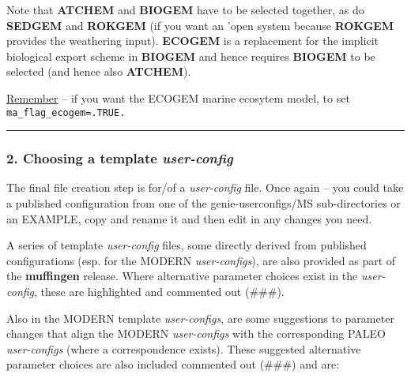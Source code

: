 \documentclass[11pt,fleqn]{book} %
\begin{document}
\noindent Note that \textbf{ATCHEM} and \textbf{BIOGEM} have to be selected together, as do \textbf{SEDGEM} and \textbf{ROKGEM} (if you want an 'open system because \textbf{ROKGEM} provides the weathering input). \textbf{ECOGEM} is a replacement for the implicit biological export scheme in \textbf{BIOGEM} and hence requires \textbf{BIOGEM} to be selected (and hence also \textbf{ATCHEM}).

\uline{Remember} -- if you want the ECOGEM marine ecosytem model, to set \texttt{ma\_flag\_ecogem=.TRUE.}

%
\noindent\rule{4cm}{0.5pt}
\subsubsection{2. Choosing a template \textit{user-config}}

The final file creation step is for/of a \textit{user-config} file. Once again -- you could take a published configuration from one of the \textsf{\footnotesize genie-userconfigs/MS} sub-directories or an EXAMPLE, copy and rename it and then edit in any changes you need.

A series of template \textit{user-config} files, some directly derived from published configurations (esp. for the MODERN \textit{user-configs}), are also provided as part of the \textbf{muffingen} release. Where alternative parameter choices exist in the \textit{user-config}, these are highlighted and commented out (\#\#\#).

Also in the MODERN template \textit{user-configs}, are some suggestions to parameter changes that align the MODERN \textit{user-configs} with the corresponding PALEO \textit{user-configs} (where a correspondence exists). These suggested alternative parameter choices are also included commented out (\#\#\#) and are:
\end{document}
